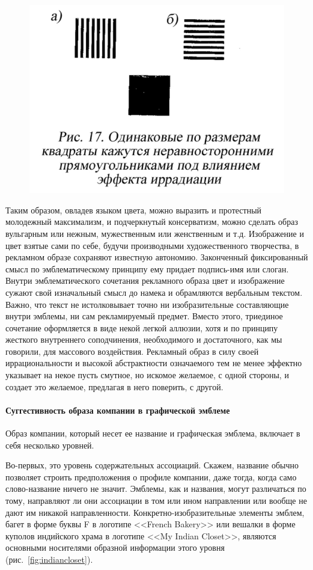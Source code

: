 \begin{figure}[h!]
  \centering
  \includegraphics[width=.5\linewidth]{images/irradation}
  \caption{} %
  \label{fig:irradation}
\end{figure}

Таким образом, овладев языком цвета, можно выразить и протестный молодежный
максимализм, и подчеркнутый консерватизм, можно сделать образ вульгарным или
нежным, мужественным или женственным и т.д. Изображение и цвет взятые сами по
себе, будучи производными художественного творчества, в рекламном образе
сохраняют известную автономию. Законченный фиксированный смысл по эмблематическому
принципу ему придает подпись-имя или слоган. Внутри эмблематического сочетания
рекламного образа цвет и изображение сужают свой изначальный смысл до намека и
обрамляются вербальным текстом. Важно, что текст не истолковывает точно ни
изобразительные составляющие внутри эмблемы, ни сам рекламируемый предмет.
Вместо этого, триединое сочетание оформляется в виде некой легкой аллюзии, хотя
и по принципу жесткого внутреннего соподчинения, необходимого и достаточного,
как мы говорили, для массового воздействия. Рекламный образ в силу своей
иррациональности и высокой абстрактности означаемого тем не менее эффектно
указывает на некое пусть смутное, но искомое желаемое, с одной стороны, и
создает это желаемое, предлагая в него поверить, с другой.

\paragraph{Суггестивность образа компании в  графической эмблеме}

Образ компании, который несет ее название и графическая эмблема, включает в
себя несколько уровней.

Во-первых, это уровень содержательных ассоциаций. Скажем, название обычно
позволяет строить предположения о профиле компании, даже тогда, когда само
слово-название ничего не значит. Эмблемы, как и названия, могут различаться по
тому, направляют ли они ассоциации в том или ином направлении или вообще не
дают им никакой направленности. Конкретно-изобразительные элементы эмблем,
багет в форме буквы F в логотипе <<French Bakery>> или вешалки в форме куполов
индийского храма в логотипе <<My Indian Closet>>, являются основными носителями
образной информации этого уровня (рис.~\ref{fig:indiancloset}).

